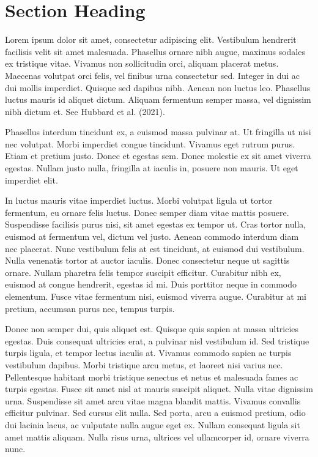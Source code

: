 \documentclass[
]{agujournal2019}
\begin{document}
\hypertarget{section-heading}{%
\section{Section Heading}\label{section-heading}}

Lorem ipsum dolor sit amet, consectetur adipiscing elit. Vestibulum
hendrerit facilisis velit sit amet malesuada. Phasellus ornare nibh
augue, maximus sodales ex tristique vitae. Vivamus non sollicitudin
orci, aliquam placerat metus. Maecenas volutpat orci felis, vel finibus
urna consectetur sed. Integer in dui ac dui mollis imperdiet. Quisque
sed dapibus nibh. Aenean non luctus leo. Phasellus luctus mauris id
aliquet dictum. Aliquam fermentum semper massa, vel dignissim nibh
dictum et. See Hubbard et al. (2021).

Phasellus interdum tincidunt ex, a euismod massa pulvinar at. Ut
fringilla ut nisi nec volutpat. Morbi imperdiet congue tincidunt.
Vivamus eget rutrum purus. Etiam et pretium justo. Donec et egestas sem.
Donec molestie ex sit amet viverra egestas. Nullam justo nulla,
fringilla at iaculis in, posuere non mauris. Ut eget imperdiet elit.

In luctus mauris vitae imperdiet luctus. Morbi volutpat ligula ut tortor
fermentum, eu ornare felis luctus. Donec semper diam vitae mattis
posuere. Suspendisse facilisis purus nisi, sit amet egestas ex tempor
ut. Cras tortor nulla, euismod at fermentum vel, dictum vel justo.
Aenean commodo interdum diam nec placerat. Nunc vestibulum felis at est
tincidunt, at euismod dui vestibulum. Nulla venenatis tortor at auctor
iaculis. Donec consectetur neque ut sagittis ornare. Nullam pharetra
felis tempor suscipit efficitur. Curabitur nibh ex, euismod at congue
hendrerit, egestas id mi. Duis porttitor neque in commodo elementum.
Fusce vitae fermentum nisi, euismod viverra augue. Curabitur at mi
pretium, accumsan purus nec, tempus turpis.

Donec non semper dui, quis aliquet est. Quisque quis sapien at massa
ultricies egestas. Duis consequat ultricies erat, a pulvinar nisl
vestibulum id. Sed tristique turpis ligula, et tempor lectus iaculis at.
Vivamus commodo sapien ac turpis vestibulum dapibus. Morbi tristique
arcu metus, et laoreet nisi varius nec. Pellentesque habitant morbi
tristique senectus et netus et malesuada fames ac turpis egestas. Fusce
sit amet nisl at mauris suscipit aliquet. Nulla vitae dignissim urna.
Suspendisse sit amet arcu vitae magna blandit mattis. Vivamus convallis
efficitur pulvinar. Sed cursus elit nulla. Sed porta, arcu a euismod
pretium, odio dui lacinia lacus, ac vulputate nulla augue eget ex.
Nullam consequat ligula sit amet mattis aliquam. Nulla risus urna,
ultrices vel ullamcorper id, ornare viverra nunc.
\end{document}
